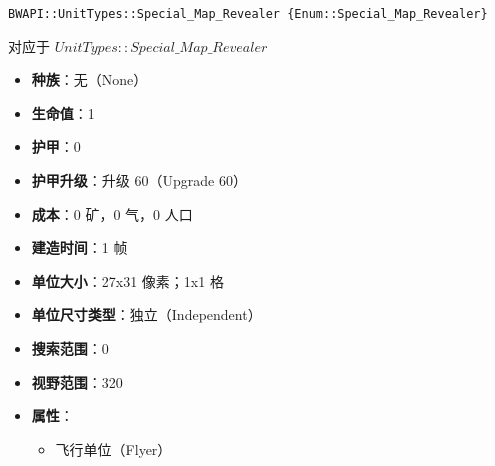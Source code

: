 \begin{tcolorbox}[colback=white, colframe=black!60!white, title=Special\_Map\_Revealer(), arc=0mm]
    \begin{verbatim}
BWAPI::UnitTypes::Special_Map_Revealer {Enum::Special_Map_Revealer}
    \end{verbatim}
    对应于  $UnitTypes::Special\_Map\_Revealer$ 
    \begin{itemize}
        \item \textbf{种族}：无（None）
        \item \textbf{生命值}：1
        \item \textbf{护甲}：0
        \item \textbf{护甲升级}：升级 60（Upgrade 60）
        \item \textbf{成本}：0 矿，0 气，0 人口
        \item \textbf{建造时间}：1 帧
        \item \textbf{单位大小}：27x31 像素；1x1 格
        \item \textbf{单位尺寸类型}：独立（Independent）
        \item \textbf{搜索范围}：0
        \item \textbf{视野范围}：320
        \item \textbf{属性}：
            \begin{itemize}
                \item 飞行单位（Flyer）
            \end{itemize}
    \end{itemize}
\end{tcolorbox}


